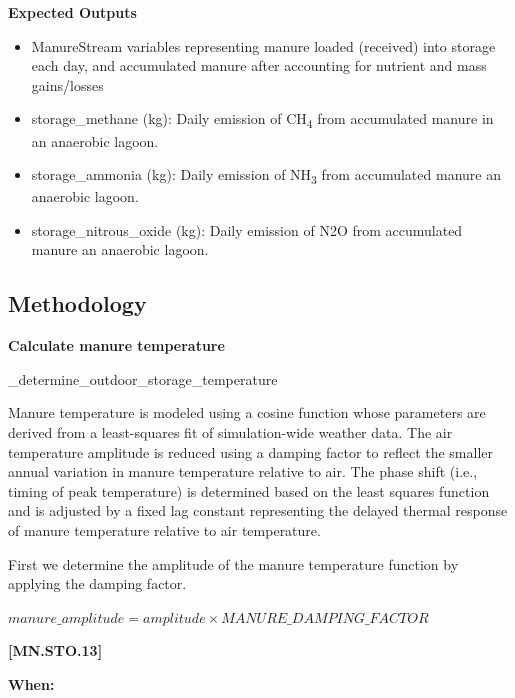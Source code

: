 \begin{refsection}
\textbf{Expected Outputs}
\vspace{ 0.25cm}

\begin{itemize}
    \item ManureStream variables representing manure loaded (received) into storage each day, and accumulated manure after accounting for nutrient and mass gains/losses
    \item storage\_methane (kg): Daily emission of CH\textsubscript{4} from accumulated manure in an anaerobic lagoon.
    \item storage\_ammonia (kg): Daily emission of NH\textsubscript{3} from accumulated manure an anaerobic lagoon.
    \item storage\_nitrous\_oxide (kg): Daily emission of N2O from accumulated manure an anaerobic lagoon.

\end{itemize}
\vspace{0.2cm}




\subsection{Methodology}

\textbf{Calculate manure temperature}
\vspace{0.2cm}

\_determine\_outdoor\_storage\_temperature
\vspace{0.2cm}

Manure temperature is modeled using a cosine function whose parameters are derived from a least-squares fit of simulation-wide weather data. The air temperature amplitude is reduced using a damping factor to reflect the smaller annual variation in manure temperature relative to air. 
The phase shift (i.e., timing of peak temperature) is determined based on the least squares function and is adjusted by a fixed lag constant representing the delayed thermal response of manure temperature relative to air temperature.
\vspace{0.2cm}

First we determine the amplitude of the manure temperature function by applying the damping factor.
        \vspace{0.25cm} 
    
    \begin{center}
        \(manure\_amplitude = amplitude \times MANURE\_DAMPING\_FACTOR \)
    \end{center}
            {\raggedleft \textbf{[MN.STO.13]}\par}
\textbf{When:}
    

\end{refsection}
